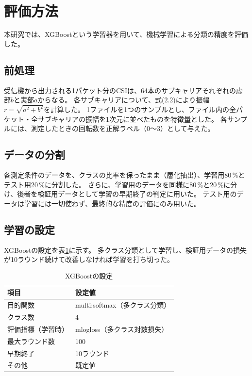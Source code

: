 \documentclass[uplatex, 12pt]{ujbook}
\begin{document}
\section{評価方法}
本研究では、XGBoostという学習器を用いて、機械学習による分類の精度を評価した。

\subsection{前処理}
受信機から出力される1パケット分のCSIは、64本のサブキャリアそれぞれの虚部$b$と実部$a$からなる。
各サブキャリアについて、式(2.2)により振幅$r=\sqrt{a^2+b^2}$を計算した。
1ファイルを1つのサンプルとし、ファイル内の全パケット・全サブキャリアの振幅を1次元に並べたものを特徴量とした。
各サンプルには、測定したときの回転数を正解ラベル（0〜3）として与えた。

\subsection{データの分割}
各測定条件のデータを、クラスの比率を保ったまま（層化抽出）、学習用80\,\%とテスト用20\,\%に分割した。
さらに、学習用のデータを同様に80\,\%と20\,\%に分け、後者を検証用データとして学習の早期終了の判定に用いた。
テスト用のデータは学習には一切使わず、最終的な精度の評価にのみ用いた。

\subsection{学習の設定}
XGBoostの設定を表\ref{tab:xgb}に示す。
多クラス分類として学習し、検証用データの損失が10ラウンド続けて改善しなければ学習を打ち切った。
\begin{table}[htbp]
  \centering
  \caption{XGBoostの設定}
  \label{tab:xgb}
  \begin{tabular}{l l}
    \toprule
    項目 & 設定値 \\
    \midrule
    目的関数 & multi:softmax（多クラス分類） \\
    クラス数 & 4 \\
    評価指標（学習時） & mlogloss（多クラス対数損失） \\
    最大ラウンド数 & 100 \\
    早期終了 & 10ラウンド \\
    その他 & 既定値 \\
    \bottomrule
  \end{tabular}
\end{table}
\end{document}
